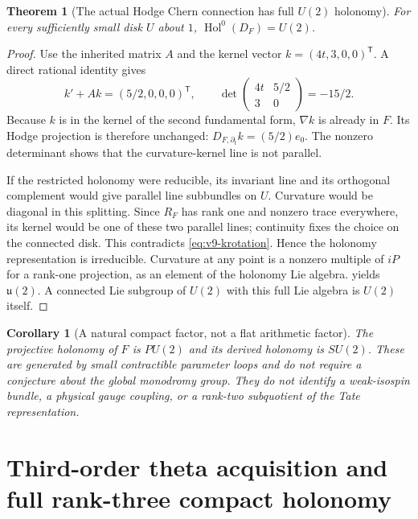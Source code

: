 \documentclass[11pt]{article}
\newtheorem{theorem}{Theorem}[section]
\newtheorem{corollary}[corollary]{Corollary}
\theoremstyle{definition}
\theoremstyle{remark}
\begin{document}
\begin{theorem}[The actual Hodge Chern connection has full $U(2)$ holonomy]
\label{thm:v9-U2}
For every sufficiently small disk $U$ about $1$,
$\operatorname{Hol}^0(D_F)=U(2)$.
\end{theorem}
\begin{proof}
Use the inherited matrix $A$ and the kernel vector $k=(4t,3,0,0)^{\mathsf T}$.
A direct rational identity gives
\begin{equation}
 \boxed{k'+Ak=(5/2,0,0,0)^{\mathsf T},\qquad
 \det\begin{pmatrix}4t&5/2\\3&0\end{pmatrix}=-15/2.}
 \label{eq:v9-krotation}
\end{equation}
Because $k$ is in the kernel of the second fundamental form, $\nabla k$
is already in $F$. Its Hodge projection is therefore unchanged:
$D_{F,\partial_t}k=(5/2)e_0$. The nonzero determinant shows that the
curvature-kernel line is not parallel.

If the restricted holonomy were reducible, its invariant line and its
orthogonal complement would give parallel line subbundles on $U$.
Curvature would be diagonal in this splitting. Since $R_F$ has rank one
and nonzero trace everywhere, its kernel would be one of these two
parallel lines; continuity fixes the choice on the connected disk.
This contradicts \cref{eq:v9-krotation}. Hence the holonomy representation
is irreducible. Curvature at any point is a nonzero multiple of $iP$ for
a rank-one projection, as an element of the holonomy Lie algebra.
 yields $\mathfrak u(2)$. A connected Lie subgroup
of $U(2)$ with this full Lie algebra is $U(2)$ itself.
\end{proof}

\begin{corollary}[A natural compact factor, not a flat arithmetic factor]
The projective holonomy of $F$ is $PU(2)$ and its derived holonomy is
$SU(2)$. These are generated by small contractible parameter loops and do
not require a conjecture about the global monodromy group. They do not
identify a weak-isospin bundle, a physical gauge coupling, or a
rank-two subquotient of the Tate representation.
\end{corollary}

\section{Third-order theta acquisition and full rank-three compact holonomy}
\label{sec:v9-U3}
\end{document}
